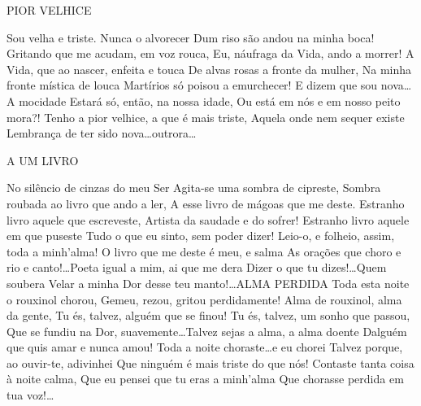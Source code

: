 PIOR VELHICE 

Sou velha e triste. Nunca o alvorecer Dum riso são andou na minha boca! Gritando que me acudam, em voz rouca, Eu, náufraga da Vida, ando a morrer! A Vida, que ao nascer, enfeita e touca De alvas rosas a fronte da mulher, Na minha fronte mística de louca Martírios só poisou a emurchecer! E dizem que sou nova\ldots A mocidade Estará só, então, na nossa idade, Ou está em nós e em nosso peito mora?! Tenho a pior velhice, a que é mais triste, Aquela onde nem sequer existe Lembrança de ter sido nova\ldots outrora\ldots 

A UM LIVRO

No silêncio de cinzas do meu Ser Agita-se uma sombra de cipreste, Sombra roubada ao livro que ando a ler, A esse livro de mágoas que me deste. Estranho livro aquele que escreveste, Artista da saudade e do sofrer! Estranho livro aquele em que puseste Tudo o que eu sinto, sem poder dizer! Leio-o, e folheio, assim, toda a minh’alma! O livro que me deste é meu, e salma As orações que choro e rio e canto!\ldots Poeta igual a mim, ai que me dera Dizer o que tu dizes!\ldots Quem soubera Velar a minha Dor desse teu manto!\ldots ALMA PERDIDA Toda esta noite o rouxinol chorou, Gemeu, rezou, gritou perdidamente! Alma de rouxinol, alma da gente, Tu és, talvez, alguém que se finou! Tu és, talvez, um sonho que passou, Que se fundiu na Dor, suavemente\ldots Talvez sejas a alma, a alma doente Dalguém que quis amar e nunca amou! Toda a noite choraste\ldots e eu chorei Talvez porque, ao ouvir-te, adivinhei Que ninguém é mais triste do que nós! Contaste tanta coisa à noite calma, Que eu pensei que tu eras a minh’alma Que chorasse perdida em tua voz!\ldots 

